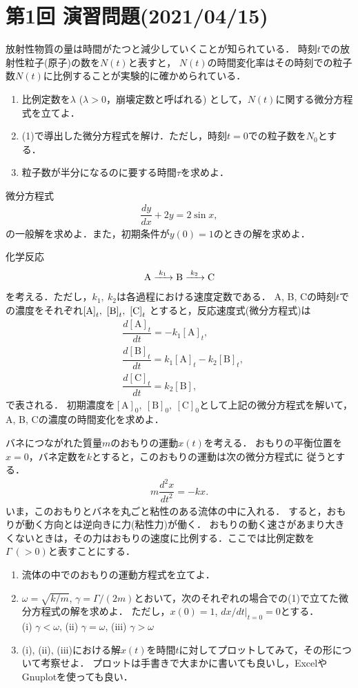 \section*{第1回 演習問題(2021/04/15)}
%
\enshu
放射性物質の量は時間がたつと減少していくことが知られている．
時刻$t$での放射性粒子(原子)の数を$N(t)$と表すと，
$N(t)$の時間変化率はその時刻での粒子数$N(t)$に比例することが実験的に確かめられている．
\begin{enumerate}[(1)]
  \item 比例定数を$\lambda$ ($\lambda>0$，崩壊定数と呼ばれる) として，$N(t)$に関する微分方程式を立てよ．
  \item (1)で導出した微分方程式を解け．ただし，時刻$t=0$での粒子数を$N_0$とする．
  \item 粒子数が半分になるのに要する時間$\tau$を求めよ．
\end{enumerate}

\enshu
微分方程式
\begin{align*}
  \dfrac{dy}{dx} + 2y = 2\sin x, 
\end{align*}
の一般解を求めよ．また，初期条件が$y(0)=1$のときの解を求めよ．

\enshu
化学反応
\begin{align*}
 \ce{A ->[k_1] B ->[k_2] C}  
\end{align*}
を考える．ただし，$k_1,~k_2$は各過程における速度定数である．
A, B, Cの時刻$t$での濃度をそれぞれ$\ce{[A]}_t,~\ce{[B]}_t,~\ce{[C]}_t$
とすると，反応速度式(微分方程式)は
\begin{align*}
  &\dfrac{d[\mathrm{A}]_t}{dt} = -k_1 [\mathrm{A}]_t, \\
  &\dfrac{d[\mathrm{B}]_t}{dt} =  k_1 [\mathrm{A}]_t - k_2 [\mathrm{B}]_t, \\
  &\dfrac{d[\mathrm{C}]_t}{dt} =  k_2 [\mathrm{B}], 
\end{align*}
で表される．
初期濃度を$[\mathrm{A}]_0,~[\mathrm{B}]_0,~[\mathrm{C}]_0$として上記の微分方程式を解いて，
A, B, Cの濃度の時間変化を求めよ．

\enshu
バネにつながれた質量$m$のおもりの運動$x(t)$を考える．
おもりの平衡位置を$x=0$，バネ定数を$k$とすると，このおもりの運動は次の微分方程式に
従うとする．
\begin{align*}
  m\dfrac{d^2x}{dt^2} = -k x. 
\end{align*}
いま，このおもりとバネを丸ごと粘性のある流体の中に入れる．
すると，おもりが動く方向とは逆向きに力(粘性力)が働く．
おもりの動く速さがあまり大きくないときは，その力はおもりの速度に比例する．ここでは比例定数を$\Gamma ~(>0)$と表すことにする．
\begin{enumerate}[(1)]
  \item 流体の中でのおもりの運動方程式を立てよ．
  \item $\omega=\sqrt{k/m}$, $\gamma = \Gamma/(2m)$とおいて，次のそれぞれの場合での(1)で立てた微分方程式の解を求めよ．
	ただし，$x(0)=1$, $dx/dt|_{t=0} = 0$とする．\\
	(i) $\gamma < \omega$, (ii) $\gamma = \omega$, (iii) $\gamma > \omega$
  \item (i), (ii), (iii)における解$x(t)$を時間$t$に対してプロットしてみて，その形について考察せよ．
	プロットは手書きで大まかに書いても良いし，ExcelやGnuplotを使っても良い．
\end{enumerate}
